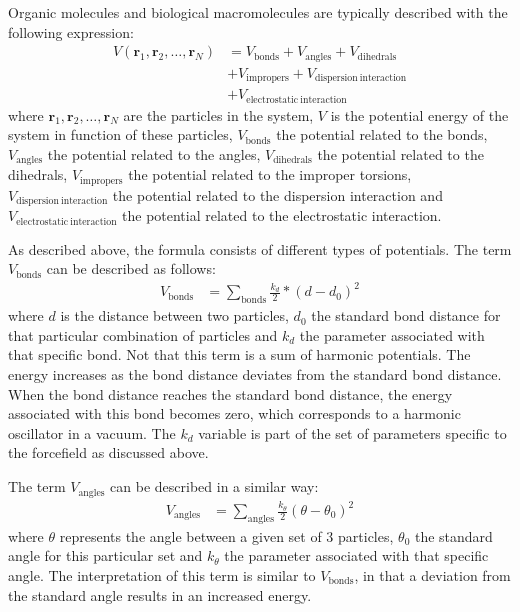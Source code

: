 \documentclass[conference]{IEEEtran}
\begin{document}
Organic molecules and biological macromolecules are typically described with the following expression:
\begin{equation}
    \begin{aligned}
    V(\mathbf{r}_1,\mathbf{r}_2,\ldots,\mathbf{r}_N) &= V_{\mathrm{bonds}} + V_{\mathrm{angles}} + 
                                                        V_{\mathrm{dihedrals}}\\
                                                    &+ V_{\mathrm{impropers}} + V_{\mathrm{dispersion \: interaction}}\\
                                                    &+ V_{\mathrm{electrostatic \: interaction}}
    \end{aligned}
\end{equation}
where $\mathbf{r}_1,\mathbf{r}_2,\ldots,\mathbf{r}_N$ are the particles in the system, $V$ is the potential energy of the
system in function of these particles, $V_{\mathrm{bonds}}$ the potential related to the bonds, $V_{\mathrm{angles}}$ 
the potential related to the angles, $V_{\mathrm{dihedrals}}$ the potential related to the dihedrals, 
$V_{\mathrm{impropers}}$ the potential related to the improper torsions, $V_{\mathrm{dispersion \: interaction}}$ 
the potential related to the dispersion interaction and $V_{\mathrm{electrostatic \: interaction}}$ the potential 
related to the electrostatic interaction. 

As described above, the formula consists of different types of potentials.
The term $V_{\mathrm{bonds}}$ can be described as follows:
\begin{equation}
    \begin{aligned}
    V_{\mathrm{bonds}} &= \sum_{\mathrm{bonds}} \frac{k_d}{2}*{(d-d_0)}^2
    \end{aligned}
\end{equation}
where $d$ is the distance between two particles, $d_0$ the standard bond distance for that particular combination of 
particles and $k_d$ the parameter associated with that specific bond. Not that this term is a sum of harmonic 
potentials. The energy increases as the bond distance deviates from the standard bond distance. When the bond 
distance reaches the standard bond distance, the energy associated with this bond becomes zero, which corresponds 
to a harmonic oscillator in a vacuum. The $k_d$ variable is part of the set of parameters specific to the 
forcefield as discussed above.

The term $V_{\mathrm{angles}}$ can be described in a similar way:
\begin{equation}
    \begin{aligned}
    V_{\mathrm{angles}} &= \sum_{\mathrm{angles}} \frac{k_{\theta}}{2}{(\theta-\theta_0)}^2
    \end{aligned}
\end{equation}
where $\theta$ represents the angle between a given set of 3 particles, $\theta_{0}$ the standard angle for this 
particular set and $k_{\theta}$ the parameter associated with that specific angle. The interpretation of this 
term is similar to $V_{\mathrm{bonds}}$, in that a deviation from the standard angle results in an increased energy.
\end{document}
